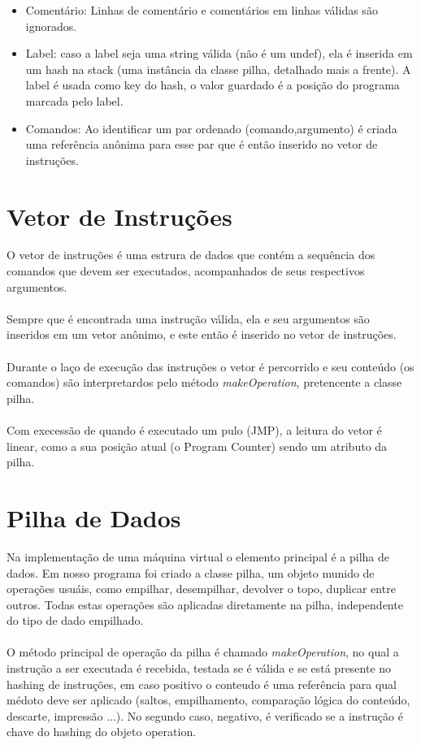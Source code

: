 \documentclass[a4paper]{article}
\begin{document}
\begin{itemize}
\item Comentário: Linhas de comentário e comentários em linhas válidas são ignorados.
\item Label: caso a label seja uma string válida (não é um undef), ela é inserida em um hash na stack (uma instância da classe pilha, detalhado mais a frente). A label é usada como key do hash, o valor guardado é a posição do programa marcada pelo label.
\item Comandos: Ao identificar um par ordenado (comando,argumento) é criada uma referência anônima para esse par que é então inserido no vetor de instruções.
\end{itemize}

\section{Vetor de Instruções}

O vetor de instruções é uma estrura de dados que contém a sequência dos comandos que devem ser executados, acompanhados de seus respectivos argumentos.\\\\
Sempre que é encontrada uma instrução válida, ela e seu argumentos são inseridos em um vetor anônimo, e este então é inserido no vetor de instruções.\\\\
Durante o laço de execução das instruções o vetor é percorrido e seu conteúdo (os comandos) são interpretardos pelo método \textit{makeOperation}, pretencente a classe pilha. \\\\
Com execessão de quando é executado um pulo (JMP), a leitura do vetor é linear, como a sua posição atual (o Program Counter) sendo um atributo da pilha.

\section{Pilha de Dados}
Na implementação de uma máquina virtual o elemento principal é a pilha de dados. Em nosso programa foi criado a classe pilha, um objeto munido de operações usuáis, como empilhar, desempilhar, devolver o topo, duplicar entre outros. Todas estas operações são aplicadas diretamente na pilha, independente do tipo de dado empilhado.\\\\
O método principal de operação da pilha é chamado \textit{makeOperation}, no qual a instrução a ser executada é recebida, testada se é válida e se está presente no hashing de instruções, em caso positivo o conteudo é uma referência para qual médoto deve ser aplicado (saltos, empilhamento, comparação lógica do conteúdo, descarte, impressão ...). No segundo caso, negativo, é verificado se a instrução é chave do hashing do objeto operation.
\end{document}
